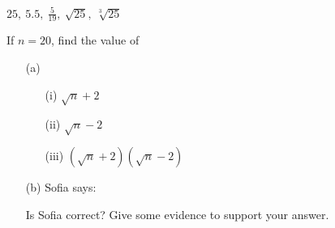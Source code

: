 \begin{multicols}{2}
\begin{uzd}
$25, \ 5.5, \ \tfrac{5}{19}, \ \sqrt{25}, \ \sqrt[3]{25}$
\end{uzd}

\begin{uzd}
If $n = 20$, find the value of

\begin{itemize}
\item[(a)] \begin{itemize}
  \item[(i)] $\sqrt{n} + 2$  
  
  \item[(ii)] $\sqrt{n} - 2$  
  
  \item[(iii)] $(\sqrt{n} + 2)(\sqrt{n} - 2)$
  \end{itemize}
\item[(b)] Sofia says:  


Is Sofia correct?
Give some evidence to support your answer.
\end{itemize}
\end{uzd}
\end{multicols}